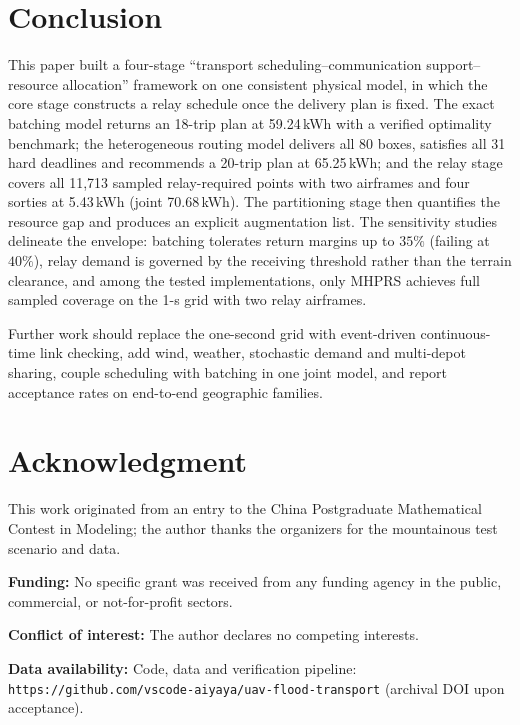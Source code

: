 \documentclass[journal]{IEEEtran}
\begin{document}
\section{Conclusion}
This paper built a four-stage ``transport scheduling--communication
support--resource allocation'' framework on one consistent physical model, in
which the core stage constructs a relay schedule once the delivery plan is
fixed. The exact
batching model returns an 18-trip plan at 59.24\,kWh with a verified optimality
benchmark; the heterogeneous routing model delivers all 80 boxes, satisfies all
31 hard deadlines and recommends a 20-trip plan at 65.25\,kWh; and the relay
stage covers all 11,713 sampled relay-required points with two airframes and four
sorties at 5.43\,kWh (joint 70.68\,kWh). The partitioning stage then quantifies
the resource gap and produces an explicit augmentation list. The sensitivity
studies delineate the envelope: batching tolerates return margins up to $35\%$
(failing at $40\%$), relay demand is governed by the receiving threshold rather
than the terrain clearance, and among the tested implementations, only MHPRS
achieves full sampled coverage on the 1-s grid with two relay airframes.

Further work should replace the one-second grid with event-driven
continuous-time link checking, add wind, weather, stochastic demand and
multi-depot sharing, couple scheduling with batching in one joint model, and
report acceptance rates on end-to-end geographic families.

\section*{Acknowledgment}
This work originated from an entry to the China Postgraduate Mathematical
Contest in Modeling; the author thanks the organizers for the
mountainous test scenario and data.

\noindent\textbf{Funding:} No specific grant was received from any
funding agency in the public, commercial, or not-for-profit sectors.

\noindent\textbf{Conflict of interest:} The author declares no competing
interests.

\noindent\textbf{Data availability:} Code, data and verification pipeline:
\texttt{https://github.com/\allowbreak vscode-aiyaya/\allowbreak uav-flood-transport}
(archival DOI upon acceptance).
\end{document}
